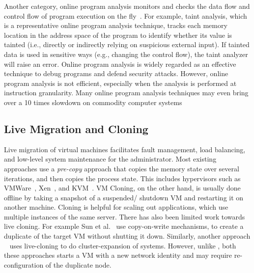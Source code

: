 Another category, online program analysis monitors and checks the data flow and control flow of program execution on the fly~\cite{goodstein2015tracking,ganai2012dtam}.
For example, taint analysis, which is a representative online program analysis technique, tracks each memory location in the address space of the program to identify whether its value is tainted (i.e., directly or indirectly relying on suspicious external input). 
If tainted data is used in sensitive ways (e.g., changing the control flow), the taint analyzer will raise an error. 
Online program analysis is widely regarded as an effective technique to debug programs and defend security attacks. 
However, online program analysis is not efficient, especially when the analysis is performed at instruction granularity. 
Many online program analysis techniques may even bring over a 10 times slowdown on commodity computer systems~\cite{Newsome05dynamictaint}

\subsection{Live Migration and Cloning}
Live migration of virtual machines facilitates fault management, load balancing, and low-level system maintenance for the administrator.
Most existing approaches use a \textit{pre-copy} approach that copies the memory state over several iterations, and then copies the process state.
This includes hypervisors such as VMWare~\cite{nelson2005fast}, Xen~\cite{clark2005live}, and KVM~\cite{kivity2007kvm}.
VM Cloning, on the other hand, is usually done offline by taking a snapshot of a suspended/ shutdown VM and restarting it on another machine.
Cloning is helpful for scaling out applications, which use multiple instances of the same server.
There has also been limited work towards live cloning. 
For example Sun et al.~\cite{Sun:2009:FLC:1581383.1582148} use copy-on-write mechanisms, to create a duplicate of the target VM without shutting it down.
Similarly, another approach ~\cite{gebhart2009dynamic} uses live-cloning to do cluster-expansion of systems.
However, unlike \parikshan, both these approaches starts a VM with a new network identity and may require re-configuration of the duplicate node.


